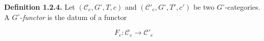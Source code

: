 \noindent\textbf{Definition 1.2.4.}\quad
Let $(\mathcal C_e,G^\circ,T,c)$ and
$(\mathcal C'_e,G^\circ,T',c')$ be two $G^\circ$-categories. A
$G^\circ$-\emph{functor} is the datum of a functor

\[
  F_e\colon\mathcal C_e\longrightarrow\mathcal C'_e
\]

